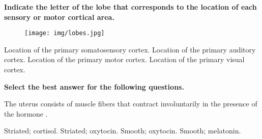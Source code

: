 \documentclass[answers]{exam}
\begin{document}
\begin{questions}



\newpage

\textbf{Indicate the letter of the lobe that corresponds to the location of each sensory or motor cortical area.}

\begin{figure}[h]
\texttt{[image: img/lobes.jpg]}
\centering
\end{figure}

\question Location of the primary somatosensory cortex.
\question Location of the primary auditory cortex.
\question Location of the primary motor cortex.
\question Location of the primary visual cortex.

\vspace{.25in}

\textbf{Select the best answer for the following questions.}

\question The uterus consists of \fillin muscle fibers that contract involuntarily in the presence of the hormone \fillin.
\begin{choices}
\choice Striated; cortisol.
\choice Striated; oxytocin.
\correctchoice Smooth; oxytocin.
\choice Smooth; melatonin.
\end{choices}


\end{questions}
\end{document}
